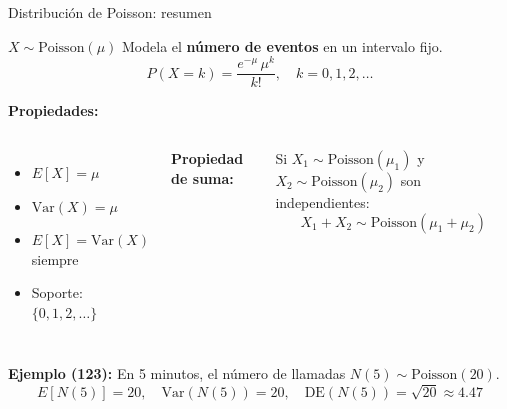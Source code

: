 \documentclass[aspectratio=1610, 9pt]{beamer}
\begin{document}
\begin{frame}{Distribuci\'{o}n de Poisson: resumen}

\begin{block}{$X \sim \text{Poisson}(\mu)$}
Modela el \textbf{n\'{u}mero de eventos} en un intervalo fijo.
\[
P(X = k) = \frac{e^{-\mu}\,\mu^k}{k!}, \quad k = 0, 1, 2, \ldots
\]
\end{block}

\vspace{0.2cm}
\textbf{Propiedades:}
\begin{columns}
\begin{itemize}
    \item $E[X] = \mu$
    \item $\text{Var}(X) = \mu$
    \item $E[X] = \text{Var}(X)$ siempre
    \item Soporte: $\{0, 1, 2, \ldots\}$
\end{itemize}

\textbf{Propiedad de suma:}

Si $X_1 \sim \text{Poisson}(\mu_1)$ y $X_2 \sim \text{Poisson}(\mu_2)$ son independientes:
\[
X_1 + X_2 \sim \text{Poisson}(\mu_1 + \mu_2)
\]
\end{columns}

\vspace{0.3cm}
\textbf{Ejemplo (123):} En 5 minutos, el n\'{u}mero de llamadas $N(5) \sim \text{Poisson}(20)$.
\[
E[N(5)] = 20, \quad \text{Var}(N(5)) = 20, \quad \text{DE}(N(5)) = \sqrt{20} \approx 4.47
\]
\end{frame}
\end{document}
